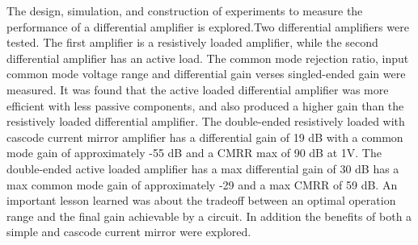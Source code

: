 

The design, simulation, and construction of experiments to measure the performance of a differential amplifier is explored.Two differential amplifiers were tested. The first amplifier is a resistively loaded amplifier, while the second differential amplifier has an active load. The common mode rejection ratio, input common mode voltage range and differential gain verses singled-ended gain were measured. It was found that the active loaded differential amplifier was more efficient with less passive components, and also produced a higher gain than the resistively loaded differential amplifier. The double-ended resistively loaded with cascode current mirror amplifier has a differential gain of 19 dB with a common mode gain of approximately -55 dB and a CMRR max of 90 dB at 1V. The double-ended active loaded amplifier has a max differential gain of 30 dB has a max common mode gain of approximately -29 and a max CMRR of 59 dB. An important lesson learned was about the tradeoff between an optimal operation range and the final gain achievable by a circuit. In addition the benefits of both a simple and cascode current mirror were explored.

